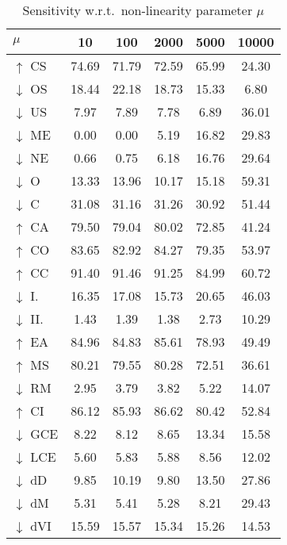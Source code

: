 \documentclass[journal]{IEEEtran}
\begin{document}
\begin{table}
	\caption{Sensitivity w.r.t.\ non-linearity parameter $\mu$}
	\centering
	\begin{tabular}{@{} l *{5}{S[table-format=2.3,detect-inline-weight=math,table-align-text-post=false]} @{}}
		\toprule
		{$\mu$}          & {10} & {100} & {2000} & {5000} & {10000} \\
		\midrule
		$\uparrow$ CS    & 74.69 & 71.79 & 72.59 & 65.99 & 24.30 \\
		$\downarrow$ OS  & 18.44 & 22.18 & 18.73 & 15.33 & 6.80 \\
		$\downarrow$ US  & 7.97 & 7.89 & 7.78 & 6.89 & 36.01 \\
		$\downarrow$ ME  & 0.00 & 0.00 & 5.19 & 16.82 & 29.83 \\
		$\downarrow$ NE  & 0.66 & 0.75 & 6.18 & 16.76 & 29.64 \\
		$\downarrow$ O   & 13.33 & 13.96 & 10.17 & 15.18 & 59.31 \\
		$\downarrow$ C   & 31.08 & 31.16 & 31.26 & 30.92 & 51.44 \\
		$\uparrow$ CA    & 79.50 & 79.04 & 80.02 & 72.85 & 41.24 \\
		$\uparrow$ CO    & 83.65 & 82.92 & 84.27 & 79.35 & 53.97 \\
		$\uparrow$ CC    & 91.40 & 91.46 & 91.25 & 84.99 & 60.72 \\
		$\downarrow$ I.  & 16.35 & 17.08 & 15.73 & 20.65 & 46.03 \\
		$\downarrow$ II. & 1.43 & 1.39 & 1.38 & 2.73 & 10.29 \\
		$\uparrow$ EA    & 84.96 & 84.83 & 85.61 & 78.93 & 49.49 \\
		$\uparrow$ MS    & 80.21 & 79.55 & 80.28 & 72.51 & 36.61 \\
		$\downarrow$ RM  & 2.95 & 3.79 & 3.82 & 5.22 & 14.07 \\
		$\uparrow$ CI    & 86.12 & 85.93 & 86.62 & 80.42 & 52.84 \\
		$\downarrow$ GCE & 8.22 & 8.12 & 8.65 & 13.34 & 15.58 \\
		$\downarrow$ LCE & 5.60 & 5.83 & 5.88 & 8.56 & 12.02 \\
		$\downarrow$ dD  & 9.85 & 10.19 & 9.80 & 13.50 & 27.86 \\
		$\downarrow$ dM  & 5.31 & 5.41 & 5.28 & 8.21 & 29.43 \\
		$\downarrow$ dVI & 15.59 & 15.57 & 15.34 & 15.26 & 14.53 \\
		\bottomrule
	\end{tabular}
	\label{tbl:paramsense_nonlin}
\end{table}
\end{document}
